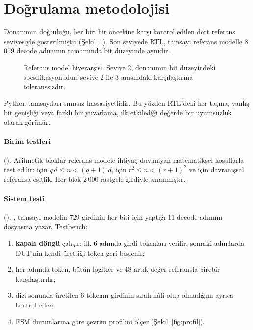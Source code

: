 \section{Doğrulama metodolojisi}

Donanımın doğruluğu, her biri bir öncekine karşı kontrol edilen dört referans seviyesiyle gösterilmiştir (Şekil~\ref{fig:dogrulama}). Son seviyede RTL, tamsayı referans modelle 8\,019 decode adımının tamamında bit düzeyinde aynıdır.

\begin{figure}[h]
  \centering
  \caption[Referans model hiyerarşisi]{Referans model hiyerarşisi. Seviye 2, donanımın bit düzeyindeki spesifikasyonudur; seviye 2 ile 3 arasındaki karşılaştırma toleranssızdır.}
  \label{fig:dogrulama}
\end{figure}

Python tamsayıları sınırsız hassasiyetlidir. Bu yüzden RTL'deki her taşma, yanlış bit genişliği veya farklı bir yuvarlama, ilk etkilediği değerde bir uyumsuzluk olarak görünür.

\paragraph{Birim testleri} (). Aritmetik bloklar referans modele ihtiyaç duymayan matematiksel koşullarla test edilir:  için $q\,d \le n < (q+1)\,d$,  için $r^2 \le n < (r+1)^2$ ve  için davranışsal referansa eşitlik. Her blok 2\,000 rastgele girdiyle sınanmıştır.

\paragraph{Sistem testi} (). , tamsayı modelin 729 girdinin her biri için yaptığı 11 decode adımını  dosyasına yazar. Testbench:
\begin{enumerate}
  \item \textbf{kapalı döngü} çalışır: ilk 6 adımda girdi tokenları verilir, sonraki adımlarda DUT'nin kendi ürettiği token geri beslenir;
  \item her adımda token, bütün logitler ve 48 artık değer referansla birebir karşılaştırılır;
  \item dizi sonunda üretilen 6 tokenın girdinin sıralı hâli olup olmadığını ayrıca kontrol eder;
  \item FSM durumlarına göre çevrim profilini ölçer (Şekil~\ref{fig:profil}).
\end{enumerate}

